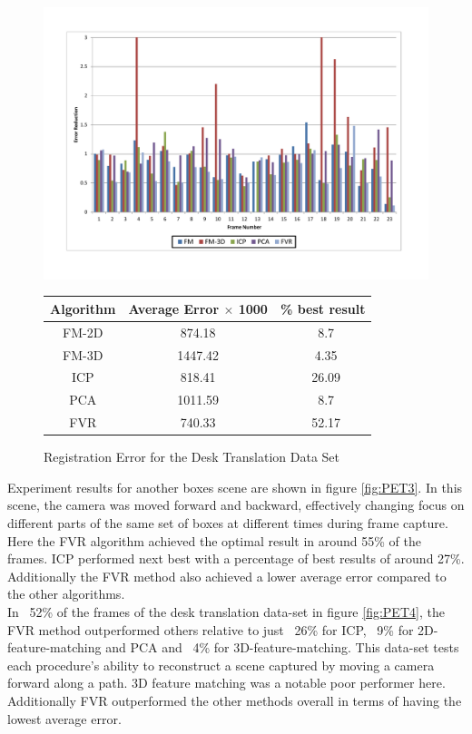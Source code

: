\begin{figure}
\centering
\includegraphics[width=6in]{images/results/Desk_Texture_Translation}
\caption{Registration Error for the Desk Translation Data Set}
\label{fig:PET4}

\begin{tabular}{ccc}
\hline
\textbf{Algorithm} & \textbf{Average Error $\times$ 1000} & \textbf{\% best result}\\ \hline
FM-2D	& 874.18 & ~8.7\\
FM-3D	& 1447.42 & ~4.35\\
ICP		& 818.41 & ~26.09\\
PCA		& 1011.59 & ~8.7\\
FVR		& 740.33 & ~52.17\\
\end{tabular}
\label{tab:PET4ST}
\end{figure} 


Experiment results for another boxes scene are shown in figure \ref{fig:PET3}. In this scene, the camera was moved forward and backward, effectively changing focus on different parts of the same set of boxes at different times during frame capture. Here the FVR algorithm achieved the optimal result in around 55\% of the frames. ICP performed next best with a percentage of best results of around 27\%. Additionally the FVR method also achieved a lower average error compared to the other algorithms. \\


In ~52\% of the frames of the desk translation data-set in figure \ref{fig:PET4}, the FVR method outperformed others relative to just ~26\% for ICP, ~9\% for 2D-feature-matching and PCA and ~4\% for 3D-feature-matching. This data-set tests each procedure's ability to reconstruct a scene captured by moving a camera forward along a path. 3D feature matching was a notable poor performer here. Additionally FVR outperformed the other methods overall in terms of having the lowest average error. \\

